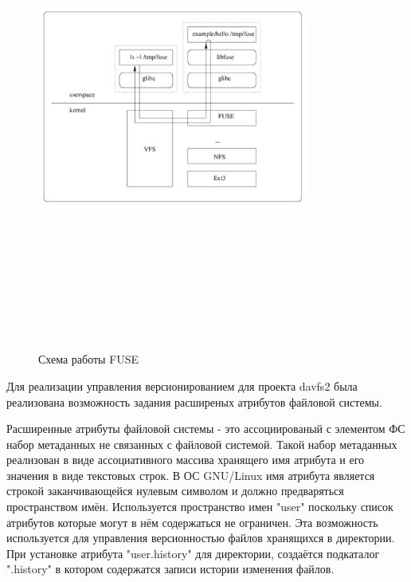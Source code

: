 \documentclass[utf8,usehyperref,12pt]{G7-32}
\begin{document}
\begin{figure}[hb!]
   \centering%
   \includegraphics[height=160mm, width=0.8\textwidth, clip, keepaspectratio]{pictures/fuse_structure}
   \caption{Схема работы FUSE}\label{fig:fuse_structure}
 \end{figure}

Для реализации управления версионированием для проекта davfs2 была реализована возможность задания расширеных атрибутов файловой системы. 

Расширенные атрибуты файловой системы - это ассоциированый с элементом ФС набор метаданных не связанных с файловой системой. Такой набор метаданных реализован в виде ассоциативного массива хранящего имя атрибута и его значения в виде текстовых строк. В ОС GNU/Linux имя атрибута является строкой заканчивающейся нулевым символом и должно предваряться пространством имён. Используется пространство имен "user" поскольку список атрибутов которые могут в нём содержаться не ограничен. Эта возможность используется для управления версионностью файлов хранящихся в директории. При установке атрибута "user.history" для директории, создаётся подкаталог ".history" в котором содержатся записи истории изменения файлов.
\end{document}
